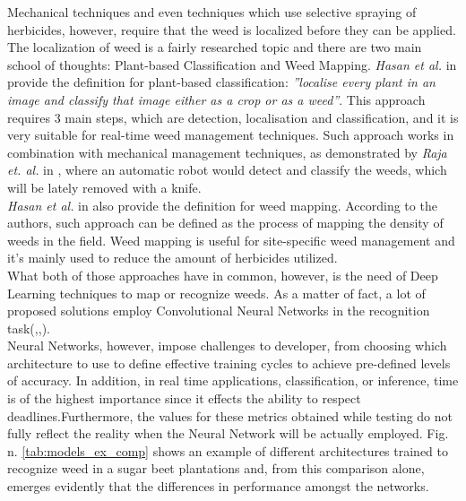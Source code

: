 Mechanical techniques and even techniques which use selective spraying of herbicides, however, require that the weed is localized before they can be applied. The localization of weed is a fairly researched topic and there are two main school of thoughts: Plant-based Classification and Weed Mapping. 
\textit{Hasan et al.} in \cite{hasan_survey_2021} provide the definition for plant-based classification: \textit{''localise every plant in an image and classify that image either as a crop or as a weed''}. This approach requires 3 main steps, which are detection, localisation and classification, and it is very suitable for real-time weed management techniques. \cite{hasan_survey_2021} 
Such approach works in combination with mechanical management techniques, as demonstrated by \textit{Raja et. al.} in \cite{raja_real-time_2020}, where an automatic robot would detect and classify the weeds, which will be lately removed with a knife.\\
\textit{Hasan et al.} in \cite{hasan_survey_2021} also provide the definition for weed mapping. According to the authors, such approach can be defined as the process of mapping the density of weeds in the field.
Weed mapping is useful for site-specific weed management and it’s mainly used to reduce the amount of herbicides utilized. \cite{hasan_survey_2021} \\
What both of those approaches have in common, however, is the need of Deep Learning techniques to map or recognize weeds. As a matter of fact, a lot of proposed solutions employ Convolutional Neural Networks in the recognition task(\cite{gao_deep_2020},\cite{suh_transfer_2018},\cite{ramirez_deep_2020}).\\
Neural Networks, however, impose challenges to developer, from choosing which architecture to use to define effective training cycles to achieve pre-defined levels of accuracy. In addition, in real time applications, classification, or inference, time is of the highest importance since it effects the ability to respect deadlines.Furthermore, the values for these metrics obtained while testing do not fully reflect the reality when the Neural Network will be actually employed. Fig. n. \ref{tab:models_ex_comp} shows an example of different architectures trained to recognize weed in a sugar beet plantations and, from this comparison alone, emerges evidently that the differences in performance amongst the networks.\\ 
